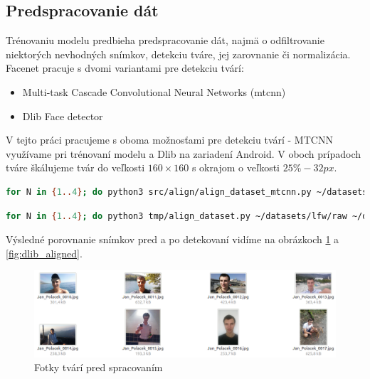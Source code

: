 \subsection{Predspracovanie dát}
Trénovaniu modelu predbieha predspracovanie dát, najmä o odfiltrovanie niektorých nevhodných snímkov, detekciu tváre, jej zarovnanie či normalizácia.
Facenet \cite{davidsan26} pracuje s dvomi variantami pre detekciu tvárí:

\begin{itemize}
	\item Multi-task Cascade Convolutional Neural Networks (\acrshort{mtcnn})
	\item Dlib Face detector
\end{itemize}

\indent V tejto práci pracujeme s oboma možnosťami pre detekciu tvárí - MTCNN využívame pri trénovaní modelu a Dlib na zariadení Android.
V oboch prípadoch tváre škálujeme tvár do veľkosti $ 160 \times 160 $ s okrajom o veľkosti $ 25\% - 32px $.

\begin{lstlisting}[language=Bash, caption={Spustenie predspracovania tvárí pomocou MTCNN}]
for N in {1..4}; do python3 src/align/align_dataset_mtcnn.py ~/datasets/lfw/raw ~/datasets/lfw/alligned --image_size 160 --margin 32 --random_order --gpu_memory_fraction 0.25 & done~
\end{lstlisting}

\begin{lstlisting}[language=Bash, caption={Spustenie predspracovania tvárí pomocou Dlib}]
for N in {1..4}; do python3 tmp/align_dataset.py ~/datasets/lfw/raw ~/datasets/lfw/alligned_dlib --image_size 160 --margin 0.20 --dlib_face_predictor ~/models/dlib/shape_predictor_68_face_landmarks.dat & done
\end{lstlisting}

\indent Výsledné porovnanie snímkov pred a po detekovaní vidíme na obrázkoch \ref{fig:dlib_raw} a \ref{fig:dlib_aligned}.

\begin{figure}[H]
	\centering
	\includegraphics[width=1\linewidth]{img/dlib_raw}
	\caption{Fotky tvárí pred spracovaním}
	\label{fig:dlib_raw}
\end{figure}

